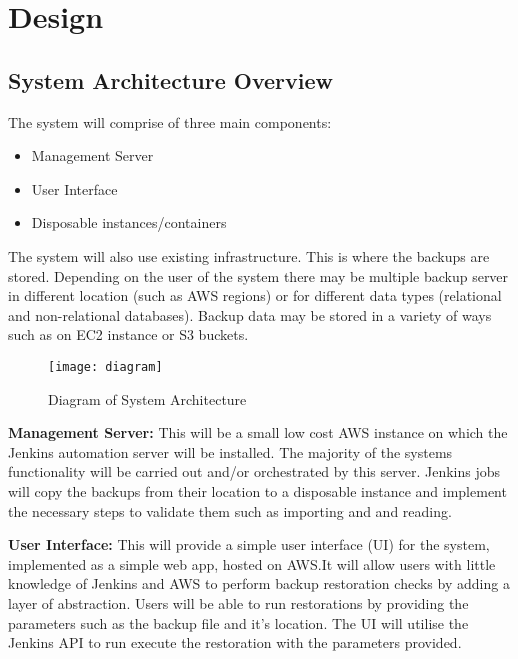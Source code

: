\section{Design}
	\subsection{System Architecture Overview}
	
	The system will comprise of three main components:
	\begin{itemize}
		\item Management Server
		\item User Interface
		\item Disposable instances/containers
	\end{itemize}
	The system will also use existing infrastructure. This is where the backups are stored. Depending on the user of the system there may be multiple backup server in different location (such as AWS regions) or for different data types (relational and non-relational databases). Backup data may be stored in a variety of ways such as on EC2 instance or S3 buckets.
	
		\begin{figure}[H]
			\setlength{\belowcaptionskip}{15pt plus 3pt minus 2pt}
			\caption{Diagram of System Architecture}
			\centering
			\texttt{[image: diagram]}
			\label{fig:diagram}
		\end{figure}
	
	\noindent \textbf{Management Server:} This will be a small low cost AWS instance on which the Jenkins automation server will be installed. The majority of the systems functionality will be carried out and/or orchestrated by this server. Jenkins jobs will copy the backups from their location to a disposable instance and implement the necessary steps to validate them such as importing and and reading.
	
	\noindent \textbf{User Interface:} This will provide a simple user interface (UI) for the system, implemented as a simple web app, hosted on AWS.It will allow users with little knowledge of Jenkins and AWS to perform backup restoration checks by adding a layer of abstraction. Users will be able to run restorations by providing the parameters such as the backup file and it's location. The UI will utilise the Jenkins API to run execute the restoration with the parameters provided.
	
